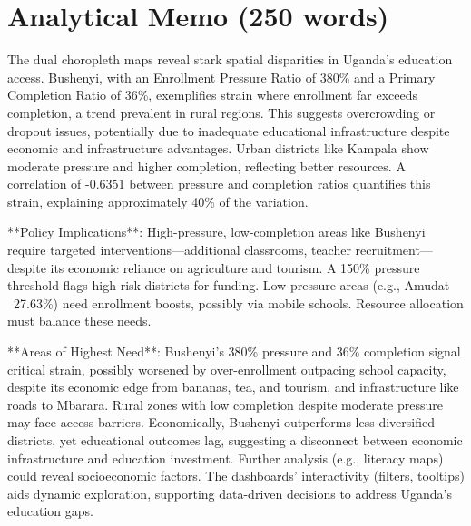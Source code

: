 \section*{Analytical Memo (250 words)}
The dual choropleth maps reveal stark spatial disparities in Uganda’s education access. Bushenyi, with an Enrollment Pressure Ratio of 380\% and a Primary Completion Ratio of 36\%, exemplifies strain where enrollment far exceeds completion, a trend prevalent in rural regions. This suggests overcrowding or dropout issues, potentially due to inadequate educational infrastructure despite economic and infrastructure advantages. Urban districts like Kampala show moderate pressure and higher completion, reflecting better resources. A correlation of -0.6351 between pressure and completion ratios quantifies this strain, explaining approximately 40\% of the variation.

**Policy Implications**: High-pressure, low-completion areas like Bushenyi require targeted interventions—additional classrooms, teacher recruitment—despite its economic reliance on agriculture and tourism. A 150\% pressure threshold flags high-risk districts for funding. Low-pressure areas (e.g., Amudat ~27.63\%) need enrollment boosts, possibly via mobile schools. Resource allocation must balance these needs.

**Areas of Highest Need**: Bushenyi’s 380\% pressure and 36\% completion signal critical strain, possibly worsened by over-enrollment outpacing school capacity, despite its economic edge from bananas, tea, and tourism, and infrastructure like roads to Mbarara. Rural zones with low completion despite moderate pressure may face access barriers. Economically, Bushenyi outperforms less diversified districts, yet educational outcomes lag, suggesting a disconnect between economic infrastructure and education investment. Further analysis (e.g., literacy maps) could reveal socioeconomic factors. The dashboards’ interactivity (filters, tooltips) aids dynamic exploration, supporting data-driven decisions to address Uganda’s education gaps.
